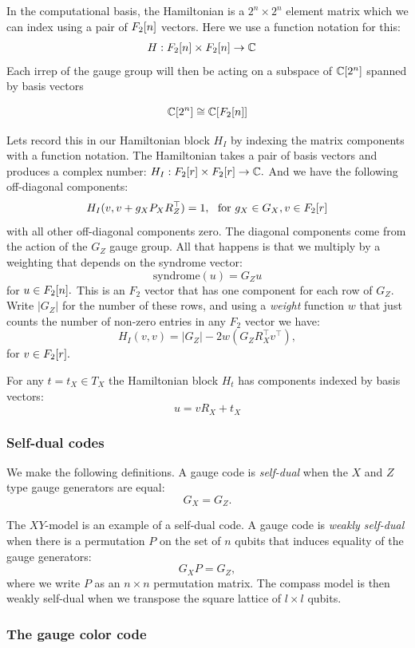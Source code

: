 \documentclass[12pt]{article}
\begin{document}
In the computational basis, the Hamiltonian
is a $2^n\times 2^n$ element matrix which
we can index using a pair of $F_2[n]$ vectors.
Here we use a function notation for this:
\begin{align*}
    H : F_2[n] \times F_2[n] &\to \mathbb{C}
\end{align*}
Each irrep of the gauge group 
will then be acting on a subspace of 
$\mathbb{C}[2^n]$ spanned by basis vectors 

$$
    \mathbb{C}[2^n] \cong \mathbb{C}[F_2[n]]
$$

Lets record this in our Hamiltonian block $H_I$
by indexing the matrix components with a function notation. 
The Hamiltonian takes a pair of
basis vectors and produces a complex number:
$H_I : F_2[r]\times F_2[r] \to \mathbb{C}.$
And we have the following off-diagonal components:
$$
    H_I(v, v+g_X P_X R_Z^\top) = 1,\ \ \mbox{for}\ g_X\in G_X, v\in F_2[r]
$$
with all other off-diagonal components zero.
The diagonal components come from 
the action of the $G_Z$ gauge group.
All that happens is that we multiply by
a weighting that depends on the syndrome
vector:
$$
    \mbox{syndrome}(u) = G_Z u
$$
for $u\in F_2[n].$
This is an $F_2$ vector that has one component for
each row of $G_Z.$
Write $|G_Z|$ for the number of these rows, and 
using a \emph{weight} function $w$ that just counts
the number of non-zero entries in any $F_2$ vector
we have:
$$
    H_I(v, v) = |G_Z| - 2w(G_Z R_X^\top v^\top),
$$
for $v\in F_2[r].$

For any $t=t_X\in T_X$ the Hamiltonian block $H_t$
has components indexed by basis vectors:
$$
    u = v R_X + t_X
$$


\subsubsection{Self-dual codes}

We make the following definitions.
A gauge code is \emph{self-dual} when the $X$ and $Z$ type
gauge generators are equal: $$G_X = G_Z.$$

The $XY$-model is an example of a self-dual code.
A gauge code is \emph{weakly self-dual}
when there is a permutation $P$ on the set of $n$ qubits
that induces equality of the gauge generators:
$$
    G_X P = G_Z,
$$
where we write $P$ as an $n\times n$ permutation matrix.
The compass model is then weakly self-dual when we transpose
the square lattice of $l\times l$ qubits.


\subsubsection{The gauge color code}
\end{document}
